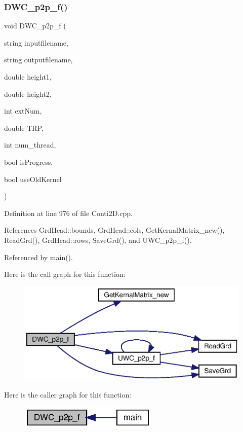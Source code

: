 \subsubsection{D\+W\+C\+\_\+p2p\+\_\+f()}
{\footnotesize\ttfamily void D\+W\+C\+\_\+p2p\+\_\+f (\begin{DoxyParamCaption}\item[{string}]{inputfilename,  }\item[{string}]{outputfilename,  }\item[{double}]{height1,  }\item[{double}]{height2,  }\item[{int}]{ext\+Num,  }\item[{double}]{T\+RP,  }\item[{int}]{num\+\_\+thread,  }\item[{bool}]{is\+Progress,  }\item[{bool}]{use\+Old\+Kernel }\end{DoxyParamCaption})}



Definition at line 976 of file Conti2\+D.\+cpp.



References Grd\+Head\+::bounds, Grd\+Head\+::cols, Get\+Kernal\+Matrix\+\_\+new(), Read\+Grd(), Grd\+Head\+::rows, Save\+Grd(), and U\+W\+C\+\_\+p2p\+\_\+f().



Referenced by main().

Here is the call graph for this function\+:
\nopagebreak
\begin{figure}[H]
\begin{center}
\leavevmode
\includegraphics[width=350pt]{Conti2D_8h_afb187c363388d28caa8a055176269f12_afb187c363388d28caa8a055176269f12_cgraph}
\end{center}
\end{figure}
Here is the caller graph for this function\+:\nopagebreak
\begin{figure}[H]
\begin{center}
\leavevmode
\includegraphics[width=188pt]{Conti2D_8h_afb187c363388d28caa8a055176269f12_afb187c363388d28caa8a055176269f12_icgraph}
\end{center}
\end{figure}
\mbox{\label{Conti2D_8h_a1bb3d1115c283e9063a98ee17fa9d31f_a1bb3d1115c283e9063a98ee17fa9d31f}} 
